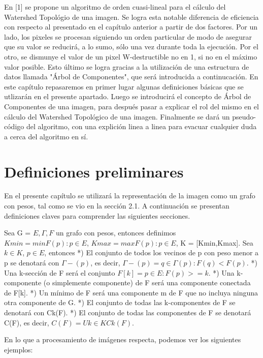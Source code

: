 
En [1] se propone  un algoritmo  de orden cuasi-lineal para el cálculo del
Watershed Topológio de una imagen. Se logra esta notable diferencia de
eficiencia con respecto al presentado en el capítulo anterior a partir de dos factores. Por un lado, los pixeles se procesan siguiendo un orden particular de modo de asegurar que su valor se
reducirá, a lo sumo, sólo una vez durante toda la ejecución. Por el
otro, se dismunye el valor de un pixel W-destructible no en 1, si no en el
máximo valor posible. Esto último se logra gracias a la utilización de una
estructura de datos llamada "Árbol de Componentes", que será introducida a continucación.
En este capítulo repasaremos en primer lugar algunas definiciones básicas que se utlizarán en el presente apartado. Luego se introducirá el concepto de Árbol de Componentes de una imagen, para después pasar a explicar el rol del mismo en el cálculo del Watershed Topológico de una imagen. Finalmente se dará un pseudo-código del algoritmo, con una explición linea a linea para evacuar cualquier duda a cerca del algoritmo en sí.

\section{Definiciones preliminares}

En el presente capítulo se utilizará la representación de la imagen como un grafo con pesos, tal como se vio en la sección 2.1. A continuación se presentan definiciones claves para comprender las siguientes secciones.

Sea G = \(E,\Gamma,F\) un grafo con pesos, entonces definimos \(Kmin = min{ F(p) : p \in E } \), \(Kmax = max{ F(p) : p \in E }\), K = [Kmin,Kmax]. Sea \(k \in K\), \(p \in E\), entonces
 *) El conjunto de todos los vecinos de p con peso menor a p se denotará con \(\Gamma-(p)\), es decir, \(\Gamma-(p) = { q \in \Gamma(p) : F(q) < F(p) }\).
  *) Una k-sección de F será el conjunto \(F[k] = { p \in E : F(p) >= k }\).
  *) Una k-componente (o simplemente componente) de F será una componente conectada de F[k].
  *) Un mínimo de F será una componente m de F que no incluya ninguna otra componente de G.
  *) El conjunto de todas las k-componentes de F se denotará con Ck(F).
  *) El conjunto de todas las componentes de F se denotará C(F), es decir, \( C(F) = Uk \in K Ck(F)\).

En lo que a procesamiento de imágenes respecta, podemos ver los siguientes ejemplos:

